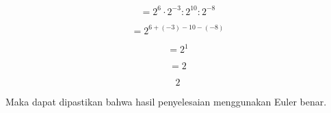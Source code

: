 \documentclass[a4paper,10pt]{article}
\begin{document}
\begin{eulernotebook}
\begin{eulercomment}
\begin{eulercomment}
\begin{eulercomment}
\begin{eulercomment}
\begin{eulercomment}
\begin{eulercomment}
\begin{eulercomment}
\begin{eulercomment}
\begin{eulercomment}
\begin{eulercomment}
\begin{eulercomment}
\begin{eulercomment}
\begin{eulercomment}
\end{eulercomment}
\begin{eulercomment}
\end{eulercomment}
\begin{eulerformula}
\[
= 2^6 \cdot 2^{-3} : 2^{10} : 2^{-8}
\]
\end{eulerformula}
\begin{eulercomment}
\end{eulercomment}
\begin{eulerformula}
\[
= 2^{6 + (-3) - 10 - (-8)}
\]
\end{eulerformula}
\begin{eulercomment}
\end{eulercomment}
\begin{eulerformula}
\[
= 2^1
\]
\end{eulerformula}
\begin{eulercomment}
\end{eulercomment}
\begin{eulerformula}
\[
= 2
\]
\end{eulerformula}
\begin{eulerformula}
\[
2
\]
\end{eulerformula}
\begin{eulercomment}
Maka dapat dipastikan bahwa hasil penyelesaian menggunakan Euler
benar.
\end{eulercomment}
\begin{eulercomment}



\end{eulercomment}
\end{eulercomment}
\end{eulercomment}
\end{eulercomment}
\end{eulercomment}
\end{eulercomment}
\end{eulercomment}
\end{eulercomment}
\end{eulercomment}
\end{eulercomment}
\end{eulercomment}
\end{eulercomment}
\end{eulercomment}
\end{eulernotebook}
\end{document}

